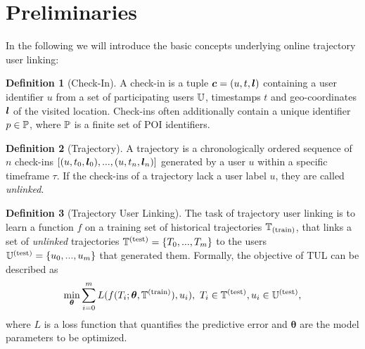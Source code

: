 \documentclass{article} %
\theoremstyle{definition}
\newtheorem{definition}{Definition}[section]
\begin{document}
\section{Preliminaries}\label{sec:preliminaries}

In the following we will introduce the basic concepts underlying online trajectory user linking:


\begin{definition}[Check-In]
    A check-in is a tuple ${\bm{c}} = (u, t, {\bm{l}})$ containing a user identifier $u$ from a set of participating users ${\mathbb{U}}$, timestamps $t$ and geo-coordinates ${\bm{l}}$ of the visited location.
    Check-ins often additionally contain a unique identifier $p\in{\mathbb{P}}$, where ${\mathbb{P}}$ is a finite set of POI identifiers.
\end{definition}

\begin{definition}[Trajectory]
    A trajectory is a chronologically ordered sequence of $n$ check-ins $[(u, t_0, {\bm{l}}_0), ..., (u, t_n, {\bm{l}}_n)]$ generated by a user $u$ within a specific timeframe $\tau$. If the check-ins of a trajectory lack a user label $u$, they are called \textit{unlinked}.
\end{definition}

\begin{definition}[Trajectory User Linking] %
    The task of trajectory user linking is to learn a function $f$ on a training set of historical trajectories ${\mathbb{T}}_{(\rm{train})}$, that links a set of \textit{unlinked} trajectories ${\mathbb{T}}^{(\rm{test})} = \{T_0, ..., T_m\}$ to the users ${\mathbb{U}}^{(\rm{test})} = \{u_0,...,u_m\}$ that generated them. Formally, the objective of TUL can be described as
    \begin{equation}
        \min_{\bm{\theta}} \sum_{i=0}^{m} L(f(T_i; \bm{\theta}, {\mathbb{T}}^{(\rm{train})}), u_i), \ T_i \in {\mathbb{T}}^{(\rm{test})}, u_i \in {\mathbb{U}}^{(\rm{test})},
    \end{equation}
    where $L$ is a loss function that quantifies the predictive error and $\bm{\theta}$ are the model parameters to be optimized.
\end{definition}
\end{document}

